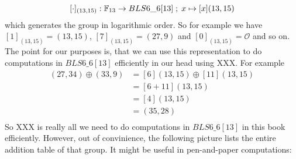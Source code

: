 $$
[\cdot]_{(13,15)}: \mathbb{F}_{13} \to BLS6\_6[13]\;;\; x \mapsto [x](13,15)
$$
which generates the group in logarithmic order. So for example we have $[1]_{(13,15)}= (13,15)$, $[7]_{(13,15)}= (27,9)$ and $[0]_{(13,15)}= \mathcal{O}$ and so on. The point for our purposes is, that we can use this representation to do computations in $BLS6\_6[13]$ efficiently in our head using XXX. For example 
\begin{align*}
(27,34)\oplus (33,9)  & = [6](13,15)\oplus [11](13,15)\\
                      & = [6+11](13,15)\\
                      & = [4](13,15)\\
                      & = (35,28)\\
\end{align*}
So XXX is really all we need to do computations in $BLS6\_6[13]$ in this book efficiently. However, out of convinience, the following picture lists the entire addition table of that group. It might be useful in pen-and-paper computations:
\begingroup
    \fontsize{5pt}{5pt}\selectfont
